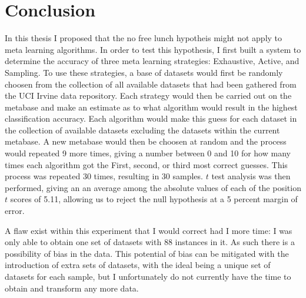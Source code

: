 \chapter{Conclusion}
\label{Chapter5}
In this thesis I proposed that the no free lunch hypotheis might not apply to
meta learning algorithms. In order to test this hypothesis, I first built a
system to determine the accuracy of three meta learning strategies:
Exhaustive, Active, and Sampling. To use these strategies, a base of
datasets would first be randomly choosen from the collection of all available
datasets that had been gathered from the UCI Irvine data repository.
Each strategy would then be carried out on the metabase and make an
estimate as to what algorithm would result in the highest classification
accuracy. Each algorithm would make this guess for each dataset in the
collection of available datasets excluding the datasets within the current
metabase. A new metabase would then be choosen at random and the process would
repeated 9 more times, giving a number between 0 and 10 for how many times
each algorithm got the First, second, or third most correct guesses.
This process was repeated 30 times, resulting in 30 samples. $t$ test analysis
was then performed, giving an an average among the absolute values of each of
the position $t$ scores of 5.11, allowing us to reject the null
hypothesis at a 5 percent margin of error.

A flaw exist within this experiment that I would correct had I more time: I was
only able to obtain one set of datasets with 88 instances in it. As such there
is a possibility of bias in the data. This potential of bias can be mitigated
with the introduction of extra sets of datasets, with the ideal being a unique
set of datasets for each sample, but I unfortunately do not currently have the
time to obtain and transform any more data.
